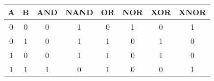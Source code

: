\renewcommand{\arraystretch}{1.3}
\setlength{\oldtabcolsep}{\tabcolsep}\setlength\tabcolsep{3pt}
\begin{center}
    \begin{tabularx}{0.78\linewidth}{@{}cccccccc@{}}
        \toprule
        A & B & AND & NAND & OR & NOR & XOR & XNOR \\
        \midrule
        0 & 0 & 0   & 1    & 0  & 1   & 0   & 1    \\
        0 & 1 & 0   & 1    & 1  & 0   & 1   & 0    \\
        1 & 0 & 0   & 1    & 1  & 0   & 1   & 0    \\
        1 & 1 & 1   & 0    & 1  & 0   & 0   & 1    \\
        \bottomrule
    \end{tabularx}
\end{center}

\renewcommand{\arraystretch}{1}
\setlength{\tabcolsep}{\oldtabcolsep}

